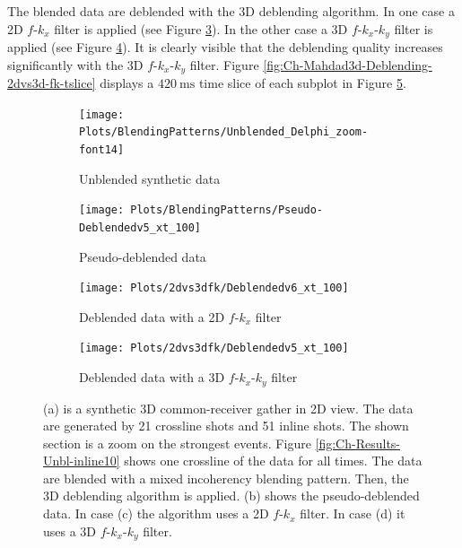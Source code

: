 The blended data are deblended with the 3D deblending algorithm. In one case a 2D $f$-$k_x$ filter is applied (see Figure \ref{fig:Ch-Mahdad3d-Deblending-2dfk}). In the other case a 3D $f$-$k_x$-$k_y$ filter is applied (see Figure \ref{fig:Ch-Mahdad3d-Deblending-3dfk}). It is clearly visible that the deblending quality increases significantly with the 3D $f$-$k_x$-$k_y$ filter. Figure \ref{fig:Ch-Mahdad3d-Deblending-2dvs3d-fk-tslice} displays a $\SI{420}{\milli\second}$ time slice of each subplot in Figure \ref{fig:Ch-Mahdad3d-Deblending-2dvs3d-fk}.
 
\begin{figure}
	
	\centering
	\begin{subfigure}[t]{0.8\textwidth}
		\centering
		\texttt{[image: Plots/BlendingPatterns/Unblended\_Delphi\_zoom-font14]}
		\caption{Unblended synthetic data}
		\label{fig:Ch-Mahdad3d-Unbl-Delphi}
	\end{subfigure}

	\par\bigskip
	
	\centering
	\begin{subfigure}[t]{0.8\textwidth}
		\texttt{[image: Plots/BlendingPatterns/Pseudo-Deblendedv5\_xt\_100]}
		\caption{Pseudo-deblended data}
		\label{fig:Ch-Mahdad3d-Deblending-Pseudo-Zoom}
	\end{subfigure}
	
	\par\bigskip

	\centering
	\begin{subfigure}[t]{0.8\textwidth}
		\texttt{[image: Plots/2dvs3dfk/Deblendedv6\_xt\_100]}
		\caption{Deblended data with a 2D $f$-$k_x$ filter}
		\label{fig:Ch-Mahdad3d-Deblending-2dfk}
	\end{subfigure}
	
	\par\bigskip
	
	\centering
	\begin{subfigure}[t]{0.8\textwidth}
		\texttt{[image: Plots/2dvs3dfk/Deblendedv5\_xt\_100]}
		\caption{Deblended data with a 3D $f$-$k_x$-$k_y$ filter}
		\label{fig:Ch-Mahdad3d-Deblending-3dfk}
	\end{subfigure}
	
	\caption{(a) is a synthetic 3D common-receiver gather in 2D view. The data are generated by 21 crossline shots and 51 inline shots. The shown section is a zoom on the strongest events. Figure \ref{fig:Ch-Results-Unbl-inline10} shows one crossline of the data for all times. The data are blended with a mixed incoherency blending pattern. Then, the 3D deblending algorithm is applied. (b) shows the pseudo-deblended data. In case (c) the algorithm uses a 2D $f$-$k_x$ filter. In case (d) it uses a 3D $f$-$k_x$-$k_y$ filter.}
	\label{fig:Ch-Mahdad3d-Deblending-2dvs3d-fk}
	
\end{figure}



